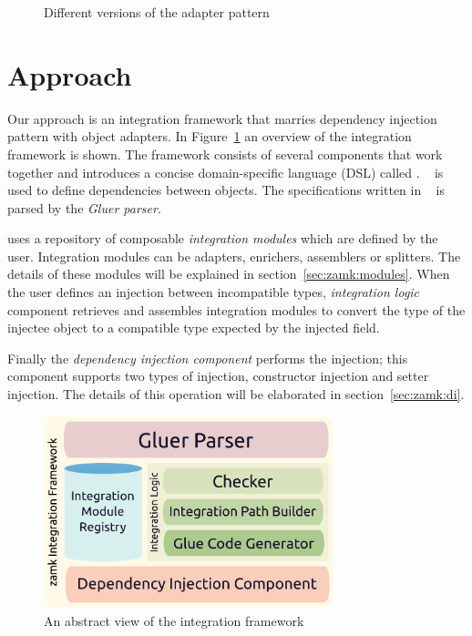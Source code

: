 \begin{figure}[h]
\centering
{}
\hfill
{}
\caption{Different versions of the adapter pattern}
\end{figure}




\section{Approach}

Our approach is an integration framework that marries dependency injection pattern with object adapters. In Figure~\ref{fig:main} an overview of the \zamk integration framework is shown. The framework consists of several components that work together and introduces a concise domain-specific language (DSL) called \gluer. \gluer~ is used to define dependencies between objects. The specifications written in \gluer~ is parsed by the \emph{Gluer parser}. 

\zamk uses a repository of composable \emph{integration modules} which are defined by the user. Integration modules can be adapters, enrichers, assemblers or splitters. The details of these modules will be explained in section~\ref{sec:zamk:modules}. When the user defines an injection between incompatible types, \emph{integration logic} component retrieves and assembles integration modules to convert the type of the injectee object to a compatible type expected by the injected field.

Finally the \emph{dependency injection component} performs the injection; this component supports two types of injection, constructor injection and setter injection. The details of this operation will be elaborated in section~\ref{sec:zamk:di}.

\begin{figure}
\centering
\def\svgwidth{\columnwidth}
%
 \includegraphics[width=0.75\textwidth]{chapterzamk/images/zamkoverview2.pdf}
\caption{An abstract view of the \zamk integration framework}
\label{fig:main}
\end{figure}

